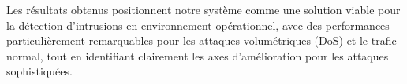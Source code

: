 Les résultats obtenus positionnent notre système comme une solution viable pour la détection d'intrusions en environnement opérationnel, avec des performances particulièrement remarquables pour les attaques volumétriques (DoS) et le trafic normal, tout en identifiant clairement les axes d'amélioration pour les attaques sophistiquées.

\newpage